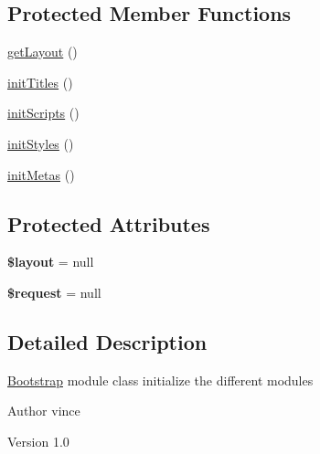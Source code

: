 \subsection*{Protected Member Functions}
\begin{DoxyCompactItemize}
\item 
\hyperlink{class_anemo_1_1_application_1_1_bootstrap_1_1_module_a5c316721766e9cd8ad5d0085e64048ed}{getLayout} ()
\item 
\hyperlink{class_anemo_1_1_application_1_1_bootstrap_1_1_module_abd95be4c00c874bcb89f69869d7130da}{initTitles} ()
\item 
\hyperlink{class_anemo_1_1_application_1_1_bootstrap_1_1_module_a2d2764dc238ecc1bd720a348dbc28249}{initScripts} ()
\item 
\hyperlink{class_anemo_1_1_application_1_1_bootstrap_1_1_module_aaf052c1009539ee0b9862dace3800c6f}{initStyles} ()
\item 
\hyperlink{class_anemo_1_1_application_1_1_bootstrap_1_1_module_af1e82b8f8422071601314fdc529c76e1}{initMetas} ()
\end{DoxyCompactItemize}
\subsection*{Protected Attributes}
\begin{DoxyCompactItemize}
\item 
\hypertarget{class_anemo_1_1_application_1_1_bootstrap_1_1_module_a2b0d08e73a90b9443ce37506b7c6a544}{
{\bfseries \$layout} = null}
\label{class_anemo_1_1_application_1_1_bootstrap_1_1_module_a2b0d08e73a90b9443ce37506b7c6a544}

\item 
\hypertarget{class_anemo_1_1_application_1_1_bootstrap_1_1_module_abb35c8495a232b510389fa6d7b15d38a}{
{\bfseries \$request} = null}
\label{class_anemo_1_1_application_1_1_bootstrap_1_1_module_abb35c8495a232b510389fa6d7b15d38a}

\end{DoxyCompactItemize}


\subsection{Detailed Description}
\hyperlink{namespace_anemo_1_1_application_1_1_bootstrap}{Bootstrap} module class initialize the different modules \begin{DoxyAuthor}{Author}
vince 
\end{DoxyAuthor}
\begin{DoxyVersion}{Version}
1.0 
\end{DoxyVersion}


